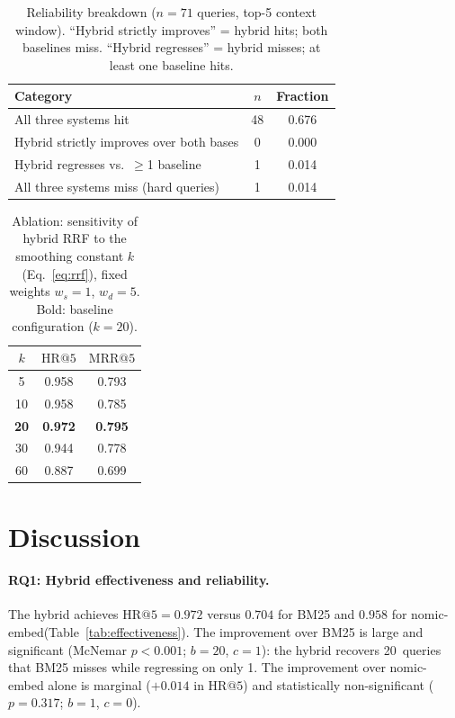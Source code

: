 \documentclass[sigconf,screen]{acmart}
\makeatletter
\newcommand{\HR}[1]{\mathrm{HR}@{#1}}
\newcommand{\MRR}[1]{\mathrm{MRR}@{#1}}
\newcommand{\nomicshort}{nomic-embed\xspace}
\newcommand{\rrf}{RRF\xspace}
\makeatother
\begin{document}
\begin{table}[ht]
\caption{Reliability breakdown ($n{=}71$ queries, top-5 context
  window).
  ``Hybrid strictly improves'' = hybrid hits; both baselines miss.
  ``Hybrid regresses'' = hybrid misses; at least one baseline hits.}
\label{tab:reliability}
\centering
\small
\begin{tabular}{@{}lcc@{}}
\toprule
Category & $n$ & Fraction \\
\midrule
All three systems hit                    & 48 & 0.676 \\
Hybrid strictly improves over both bases &  0 & 0.000 \\
Hybrid regresses vs.\ $\geq$1 baseline  &  1 & 0.014 \\
All three systems miss (hard queries)    &  1 & 0.014 \\
\bottomrule
\end{tabular}
\end{table}

\begin{table}[ht]
\caption{Ablation: sensitivity of hybrid \rrf to the smoothing
  constant $k$ (Eq.~\ref{eq:rrf}), fixed weights $w_s{=}1$,
  $w_d{=}5$.  Bold: baseline configuration ($k{=}20$).}
\label{tab:ablation}
\centering
\small
\begin{tabular}{@{}ccc@{}}
\toprule
$k$  & $\HR{5}$ & $\MRR{5}$ \\
\midrule
  5  & 0.958 & 0.793 \\
 10  & 0.958 & 0.785 \\
\textbf{20}  & \textbf{0.972} & \textbf{0.795} \\
 30  & 0.944 & 0.778 \\
 60  & 0.887 & 0.699 \\
\bottomrule
\end{tabular}
\end{table}

\section{Discussion}
\label{sec:discussion}

\paragraph{RQ1: Hybrid effectiveness and reliability.}
The hybrid achieves $\HR{5}{=}0.972$ versus $0.704$ for BM25 and
$0.958$ for \nomicshort (Table~\ref{tab:effectiveness}).  The
improvement over BM25 is large and significant (McNemar $p{<}0.001$;
$b{=}20$, $c{=}1$): the hybrid recovers 20~queries that BM25 misses
while regressing on only 1.  The improvement over \nomicshort alone
is marginal ($+0.014$ in $\HR{5}$) and statistically non-significant
($p{=}0.317$; $b{=}1$, $c{=}0$).
\end{document}
